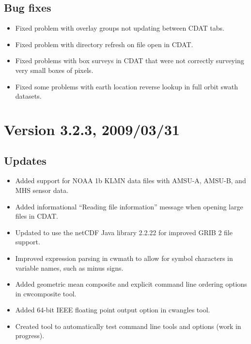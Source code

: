 \subsection*{ Bug fixes}
\begin{itemize}

  \item Fixed problem with overlay groups not updating between CDAT
  tabs.

  \item Fixed problem with directory refresh on file open in CDAT.
  
  \item Fixed problems with box surveys in CDAT that were not
  correctly surveying very small boxes of pixels.

  \item Fixed some problems with earth location reverse lookup in full
  orbit swath datasets.

\end{itemize}




\section*{Version 3.2.3, 2009/03/31}
  
\subsection*{ Updates}

\begin{itemize}

  \item Added support for NOAA 1b KLMN data files with AMSU-A,
    AMSU-B, and MHS sensor data.

  \item Added informational ``Reading file information'' message
    when opening large files in CDAT.

  \item Updated to use the netCDF Java library 2.2.22 for
    improved GRIB 2 file support.

  \item Improved expression parsing in cwmath to allow for symbol
    characters in variable names, such as minus signs.

  \item Added geometric mean composite and explicit command line
    ordering options in cwcomposite tool.

  \item Added 64-bit IEEE floating point output option in
    cwangles tool.

  \item Created tool to automatically test command line tools and
    options (work in progress).

\end{itemize}

